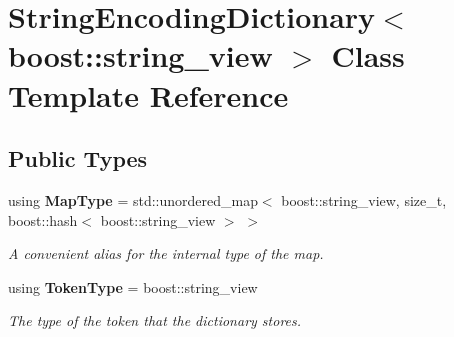 \section{String\+Encoding\+Dictionary$<$ boost\+:\+:string\+\_\+view $>$ Class Template Reference}
\label{classmlpack_1_1data_1_1StringEncodingDictionary_3_01boost_1_1string__view_01_4}
\subsection*{Public Types}
\begin{DoxyCompactItemize}
\item 
using \textbf{ Map\+Type} = std\+::unordered\+\_\+map$<$ boost\+::string\+\_\+view, size\+\_\+t, boost\+::hash$<$ boost\+::string\+\_\+view $>$ $>$
\begin{DoxyCompactList}\small\item\em A convenient alias for the internal type of the map. \end{DoxyCompactList}\item 
using \textbf{ Token\+Type} = boost\+::string\+\_\+view
\begin{DoxyCompactList}\small\item\em The type of the token that the dictionary stores. \end{DoxyCompactList}\end{DoxyCompactItemize}
